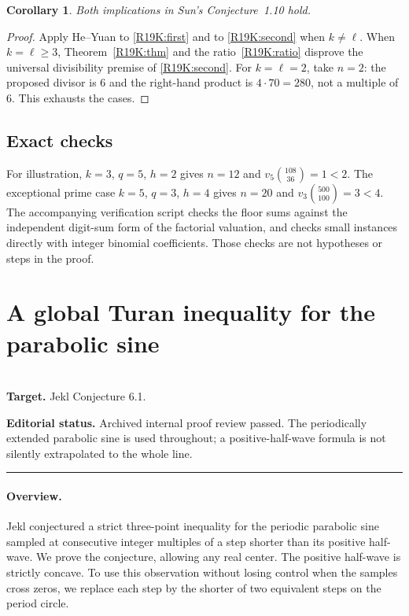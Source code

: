 \documentclass[11pt,a4paper]{article}
\newtheorem{SourceRbjKcorollary}[SourceRbjKtheorem]{Corollary}
\begin{document}
\begin{SourceRbjKcorollary}
Both implications in Sun's Conjecture~1.10 hold.
\end{SourceRbjKcorollary}

\begin{proof}
Apply He--Yuan \cite[Theorem~1.8]{R19K:HY} to \eqref{R19K:first} and
\cite[Theorem~1.9]{R19K:HY} to \eqref{R19K:second} when $k\ne\ell$.
When $k=\ell\ge3$, Theorem~\ref{R19K:thm} and the ratio~\eqref{R19K:ratio}
disprove the universal divisibility premise of \eqref{R19K:second}.
For $k=\ell=2$, take $n=2$: the proposed divisor is $6$ and the
right-hand product is $4\cdot70=280$, not a multiple of $6$.
This exhausts the cases.
\end{proof}

\subsection{Exact checks}
For illustration, $k=3$, $q=5$, $h=2$ gives $n=12$ and
$v_5\binom{108}{36}=1<2$. The exceptional prime case $k=5$,
$q=3$, $h=4$ gives $n=20$ and $v_3\binom{500}{100}=3<4$.
The accompanying verification script checks the floor sums
against the independent digit-sum form of the factorial valuation,
and checks small instances directly with integer binomial
coefficients. Those checks are not hypotheses or steps in the proof.
\endgroup


\clearpage

\section{A global Turan inequality for the parabolic sine}
\label{section:R20M}
\\[3pt]
\noindent\textbf{Target.} Jekl Conjecture 6.1.

\noindent\textbf{Editorial status.} Archived internal proof review passed. The periodically extended parabolic sine is used throughout; a positive-half-wave formula is not silently extrapolated to the whole line.

\smallskip\hrule\medskip



\begingroup
\newcommand{\R}{\mathbb R}
\newcommand{\Z}{\mathbb Z}
\setcounter{equation}{0}
\renewcommand{\theequation}{\thesection.\arabic{equation}}
\renewcommand{\theHequation}{R20M.\arabic{equation}}
\paragraph{Overview.}
Jekl conjectured a strict three-point inequality for the periodic parabolic
sine sampled at consecutive integer multiples of a step shorter than its
positive half-wave. We prove the conjecture, allowing any real center.
The positive half-wave is strictly concave. To use this observation without
losing control when the samples cross zeros, we replace each step by the
shorter of two equivalent steps on the period circle.
\end{document}
